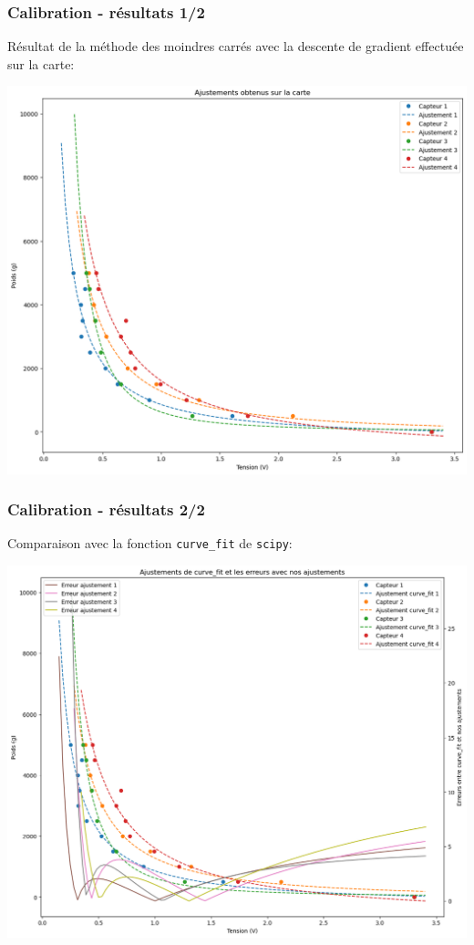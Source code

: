 \begin{frame}
\frametitle{Calibration - résultats 1/2}
Résultat de la méthode des moindres carrés avec la descente de gradient effectuée sur la carte:
\begin{center}
\includegraphics[scale=0.3]{./figures/cal_01.png}
\end{center}
\end{frame}

\begin{frame}
\frametitle{Calibration - résultats 2/2}
Comparaison avec la fonction \texttt{curve\_fit} de \texttt{scipy}:
\begin{center}
\includegraphics[scale=0.3]{./figures/cal_02.png}
\end{center}
\end{frame}

